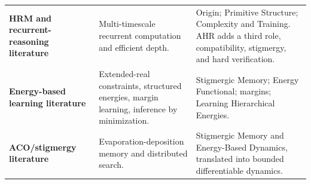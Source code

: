 \documentclass[11pt,oneside]{book}
\theoremstyle{remark}
\begin{document}
\begin{longtable}{>{\bfseries\RaggedRight\arraybackslash}p{}
>{\RaggedRight\arraybackslash}p{}
>{\RaggedRight\arraybackslash}p{}}
HRM and recurrent-reasoning literature & Multi-timescale recurrent computation and efficient depth. & Origin; Primitive Structure; Complexity and Training. AHR adds a third role, compatibility, stigmergy, and hard verification. \\
Energy-based learning literature & Extended-real constraints, structured energies, margin learning, inference by minimization. & Stigmergic Memory; Energy Functional; margins; Learning Hierarchical Energies. \\
ACO/stigmergy literature & Evaporation-deposition memory and distributed search. & Stigmergic Memory and Energy-Based Dynamics, translated into bounded differentiable dynamics. \\
\bottomrule
\end{longtable}

\backmatter
\end{document}
